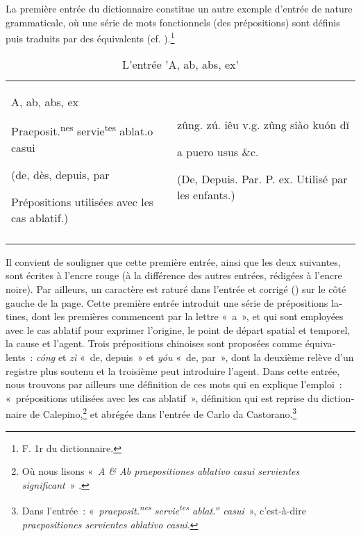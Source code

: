 \documentclass[output=paper,colorlinks,citecolor=brown,arabicfont,chinesefont,booklanguage=french]{langscibook}
\begin{document}
\begin{otherlanguage}{french}
La première entrée du dictionnaire constitue un autre exemple d’entrée de nature grammaticale, où une série de mots fonctionnels (des prépositions) sont définis puis traduits par des équivalents (cf. ).\footnote{F. 1r du dictionnaire.}

\begin{table}
\caption{L'entrée 'A, ab, abs, ex'}
\label{tab:gianninoto:4}
\label{tab:gianninoto:frequencies4}
\begin{tabularx}{\linewidth} { QQ }
\lsptoprule
A, ab, abs, ex

Praeposit.\textsuperscript{nes} servie\textsuperscript{tes} ablat.o casui

\footnotesize (de, dès, depuis, par

 Prépositions utilisées avec les cas ablatif.) & {}
 
zûng. zú. iêu   v.g. zûng siào kuón dĭ

a puero usus \&c.

\footnotesize{(De, Depuis. Par.  P. ex. Utilisé par les enfants.)}\\
\lspbottomrule
\end{tabularx}
\end{table}

Il convient de souligner que cette première entrée, ainsi que les deux suivantes, sont écrites à l’encre rouge (à la différence des autres entrées, rédigées à l’encre noire). Par ailleurs, un caractère est raturé dans l’entrée et corrigé ({}) sur le côté gauche de la page. Cette première entrée introduit une série de prépositions latines, dont les premières commencent par la lettre «~a~», et qui sont employées avec le cas ablatif pour exprimer l’origine, le point de départ spatial et temporel, la cause et l’agent. Trois prépositions chinoises sont proposées comme équivalents~: \emph{cóng} {} et \emph{zì} {} «~de, depuis~» et \emph{yóu} {} «~de, par~», dont la deuxième relève d’un registre plus soutenu et la troisième peut introduire l’agent. Dans cette entrée, nous trouvons par ailleurs une définition de ces mots qui en explique l’emploi~: «~prépositions utilisées avec les cas ablatif~», définition qui est reprise du dictionnaire de Calepino,\footnote{Où nous lisons «~\emph{A \& Ab praepositiones ablativo casui servientes significant}~» \citet[12]{Calderino1585}.} et abrégée dans l’entrée de Carlo da Castorano.\footnote{Dans l’entrée~: «~\emph{praeposit.\textsuperscript{nes} servie\textsuperscript{tes} ablat.\textsuperscript{o} casui}~», c’est-à-dire \emph{praepositiones servientes ablativo casui}.}


\end{otherlanguage}
\end{document}
